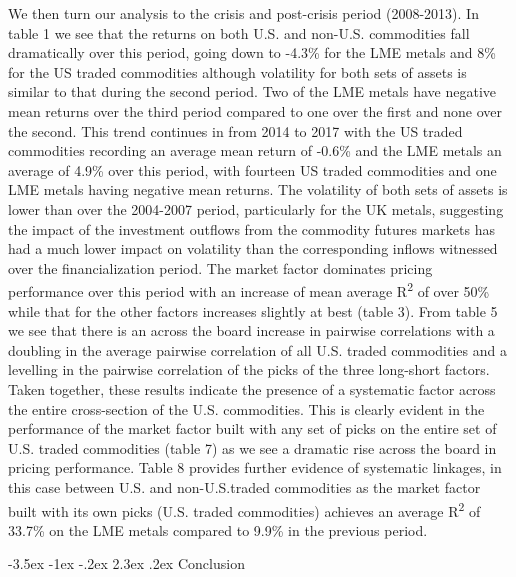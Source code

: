 \documentclass[11pt, letterpaper, doublespacing]{article}
\makeatletter
\renewcommand{\section}{\@startsection {section}{1}{\z@}%
  {-3.5ex \@plus -1ex \@minus -.2ex}%
  {2.3ex \@plus.2ex}%
  {\centering\normalfont\large\bfseries}}
\makeatother
\begin{document}
We then turn our analysis to the crisis and post-crisis period
(2008-2013). In table 1 we see that the returns on both U.S. and
non-U.S. commodities fall dramatically over this period, going down to
-4.3\% for the LME metals and 8\% for the US traded commodities although
volatility for both sets of assets is similar to that during the second
period. Two of the LME metals have negative mean returns over the third
period compared to one over the first and none over the second. This
trend continues in from 2014 to 2017 with the US traded commodities
recording an average mean return of -0.6\% and the LME metals an average
of 4.9\% over this period, with fourteen US traded commodities and one
LME metals having negative mean returns. The volatility of both sets of
assets is lower than over the 2004-2007 period, particularly for the UK
metals, suggesting the impact of the investment outflows from the
commodity futures markets has had a much lower impact on volatility than
the corresponding inflows witnessed over the financialization period.
The market factor dominates pricing performance over this period with an
increase of mean average R\textsuperscript{2} of over 50\% while that
for the other factors increases slightly at best (table 3). From table 5
we see that there is an across the board increase in pairwise
correlations with a doubling in the average pairwise correlation of all
U.S. traded commodities and a levelling in the pairwise correlation of
the picks of the three long-short factors. Taken together, these results
indicate the presence of a systematic factor across the entire
cross-section of the U.S. commodities. This is clearly evident in the
performance of the market factor built with any set of picks on the
entire set of U.S. traded commodities (table 7) as we see a dramatic
rise across the board in pricing performance. Table 8 provides further
evidence of systematic linkages, in this case between U.S. and
non-U.S.traded commodities as the market factor built with its own picks
(U.S. traded commodities) achieves an average R\textsuperscript{2} of
33.7\% on the LME metals compared to 9.9\% in the previous period.

\section{Conclusion}\label{conclusion}
\end{document}
